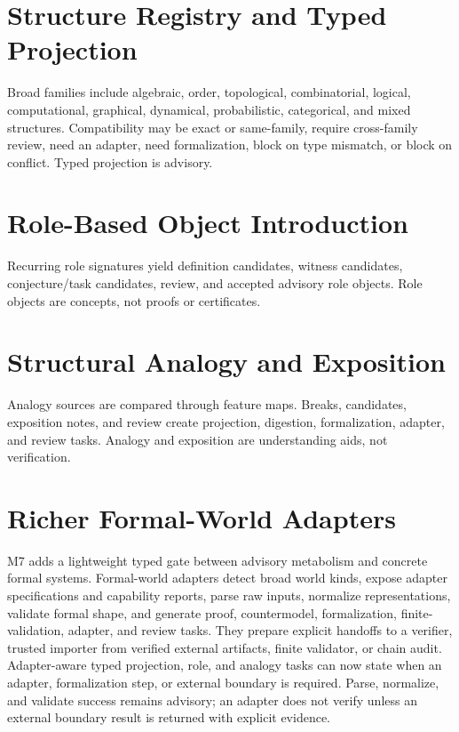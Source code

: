 \documentclass[11pt,a4paper]{article}
\begin{document}
\section{Structure Registry and Typed Projection}
Broad families include algebraic, order, topological, combinatorial, logical, computational, graphical, dynamical, probabilistic, categorical, and mixed structures. Compatibility may be exact or same-family, require cross-family review, need an adapter, need formalization, block on type mismatch, or block on conflict. Typed projection is advisory.

\section{Role-Based Object Introduction}
Recurring role signatures yield definition candidates, witness candidates, conjecture/task candidates, review, and accepted advisory role objects. Role objects are concepts, not proofs or certificates.

\section{Structural Analogy and Exposition}
Analogy sources are compared through feature maps. Breaks, candidates, exposition notes, and review create projection, digestion, formalization, adapter, and review tasks. Analogy and exposition are understanding aids, not verification.

\section{Richer Formal-World Adapters}
M7 adds a lightweight typed gate between advisory metabolism and concrete
formal systems. Formal-world adapters detect broad world kinds, expose adapter
specifications and capability reports, parse raw inputs, normalize
representations, validate formal shape, and generate proof, countermodel,
formalization, finite-validation, adapter, and review tasks. They prepare
explicit handoffs to a verifier, trusted importer from verified external
artifacts, finite validator, or chain audit. Adapter-aware typed projection,
role, and analogy tasks can now state when an adapter, formalization step, or
external boundary is required. Parse, normalize, and validate success remains
advisory; an adapter does not verify unless an external boundary result is
returned with explicit evidence.
\end{document}
